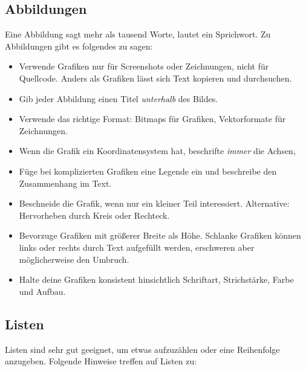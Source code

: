 \documentclass[a4paper,titlepage=true,twoside]{scrartcl}
\newcommand{\latexenv}[1]{\textsf{#1}}
\begin{document}
\subsection{Abbildungen}
Eine Abbildung sagt mehr als tausend Worte, lautet ein Sprichwort. Zu Abbildungen
gibt es folgendes zu sagen:

\begin{itemize}
 \item Verwende Grafiken nur für Screenshots oder Zeichnungen, nicht für Quellcode.
  Anders als Grafiken lässt sich Text kopieren und durchsuchen.
 \item Gib jeder Abbildung einen Titel \emph{unterhalb} des Bildes.
 \item Verwende das richtige Format: Bitmaps für Grafiken, Vektorformate für Zeichnungen.
 \item Wenn die Grafik ein Koordinatensystem hat, beschrifte \emph{immer} die Achsen, 
 \item Füge bei komplizierten Grafiken eine Legende ein und beschreibe den Zusammenhang 
      im Text.
 \item Beschneide die Grafik, wenn nur ein kleiner Teil interessiert. Alternative:
  Hervorheben durch Kreis oder Rechteck.
 \item Bevorzuge Grafiken mit größerer Breite als Höhe. Schlanke Grafiken können links
  oder rechts durch Text aufgefüllt werden, erschweren aber möglicherweise den Umbruch.
 \item Halte deine Grafiken konsistent hinsichtlich Schriftart, Strichstärke, 
  Farbe und Aufbau.
\end{itemize}



\subsection{Listen}
Listen sind sehr gut geeignet, um etwas aufzuzählen oder eine Reihenfolge anzugeben. 
Folgende Hinweise treffen auf Listen zu:
\end{document}
